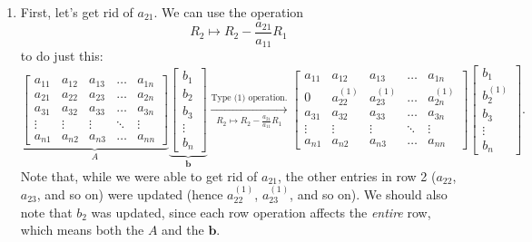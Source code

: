 \documentclass[letterpaper]{article}
\newcommand{\0}{\mathbf{0}}
\renewcommand{\b}{\mathbf{b}}
\begin{document}
\begin{enumerate}
    \item First, let's get rid of $a_{21}$. We can use the operation \[R_2 \mapsto R_2 - \frac{a_{21}}{a_{11}} R_1\] to do just this: 
    \[\underbrace{\begin{bmatrix}
        a_{11} & a_{12} & a_{13} & \hdots & a_{1n} \\ 
        a_{21} & a_{22} & a_{23} & \hdots & a_{2n} \\ 
        a_{31} & a_{32} & a_{33} & \hdots & a_{3n} \\ 
        \vdots & \vdots & \vdots & \ddots & \vdots \\ 
        a_{n1} & a_{n2} & a_{n3} & \hdots & a_{nn}
    \end{bmatrix}}_{A} \underbrace{\begin{bmatrix}
        b_1 \\ b_2 \\ b_3 \\ \vdots \\ b_n
    \end{bmatrix}}_{\b} \xrightarrow[R_2 \mapsto R_2 - \frac{a_{21}}{a_{11}} R_1]{\text{Type (1) operation.}} \begin{bmatrix}
        a_{11} & a_{12} & a_{13} & \hdots & a_{1n} \\ 
        0      & a_{22}^{(1)} & a_{23}^{(1)} & \hdots & a_{2n}^{(1)} \\ 
        a_{31} & a_{32} & a_{33} & \hdots & a_{3n} \\ 
        \vdots & \vdots & \vdots & \ddots & \vdots \\ 
        a_{n1} & a_{n2} & a_{n3} & \hdots & a_{nn}
    \end{bmatrix} \begin{bmatrix}
        b_1 \\ b_2^{(1)} \\ b_3 \\ \vdots \\ b_n
    \end{bmatrix}.\]
    Note that, while we were able to get rid of $a_{21}$, the other entries in row 2 ($a_{22}$, $a_{23}$, and so on) were updated (hence $a_{22}^{(1)}$, $a_{23}^{(1)}$, and so on). We should also note that $b_2$ was updated, since each row operation affects the \emph{entire} row, which means both the $A$ and the $\b$. 


\end{enumerate}
\end{document}
